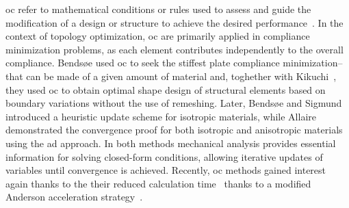 \gls{oc} refer to mathematical conditions or rules used to assess and guide the modification of a design or structure to achieve the desired performance~. In the context of topology optimization, \gls{oc} are primarily applied in compliance minimization problems, as each element contributes independently to the overall compliance. Bendsøe used \gls{oc} to seek the stiffest plate \ie compliance minimization--that can be made of a given amount of material and, toghether with Kikuchi~, they used \gls{oc} to obtain optimal shape design of structural elements based on boundary variations without the use of remeshing. Later, Bendsøe and Sigmund~ introduced a heuristic update scheme for isotropic materials, while Allaire \etal~ demonstrated the convergence proof for both isotropic and anisotropic materials using the \gls{ad} approach. In both methods mechanical analysis provides essential information for solving closed-form conditions, allowing iterative updates of variables until convergence is achieved. Recently, \gls{oc} methods gained interest again thanks to the their reduced calculation time~ thanks to a modified Anderson acceleration strategy~.


